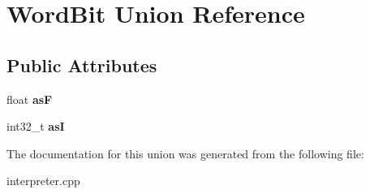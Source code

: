 \hypertarget{union_word_bit}{}\section{Word\+Bit Union Reference}
\label{union_word_bit}
\subsection*{Public Attributes}
\begin{DoxyCompactItemize}
\item 
float {\bfseries asF}\hypertarget{union_word_bit_a5b962bf201f563d29386ba0a024cd299}{}\label{union_word_bit_a5b962bf201f563d29386ba0a024cd299}

\item 
int32\+\_\+t {\bfseries asI}\hypertarget{union_word_bit_a17f2d270c0c1e3131127ed6b409da1ce}{}\label{union_word_bit_a17f2d270c0c1e3131127ed6b409da1ce}

\end{DoxyCompactItemize}


The documentation for this union was generated from the following file\+:\begin{DoxyCompactItemize}
\item 
interpreter.\+cpp\end{DoxyCompactItemize}
